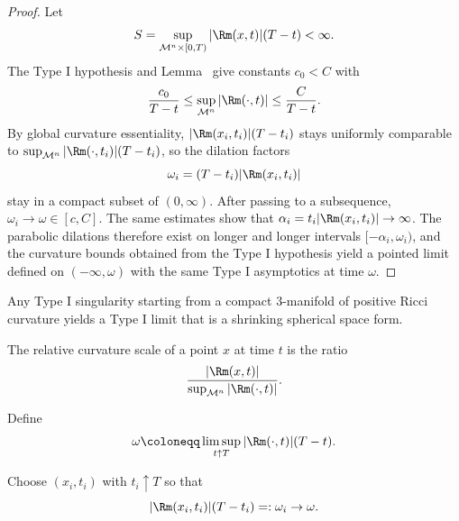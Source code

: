\begin{proof}
\sketch Let
\[
S=\sup_{\mathcal M^n\times[0,T)}|\Rm(x,t)|(T-t)<\infty.
\]
The Type I hypothesis and Lemma~ give constants \(c_0<C\) with
\[
\frac{c_0}{T-t}\le \sup_{\mathcal M^n}|\Rm(\cdot,t)|\le \frac{C}{T-t}.
\]
By global curvature essentiality, \(|\Rm(x_i,t_i)|(T-t_i)\) stays uniformly comparable to \(\sup_{\mathcal M^n}|\Rm(\cdot,t_i)|(T-t_i)\), so the dilation factors
\[
\omega_i=(T-t_i)|\Rm(x_i,t_i)|
\]
stay in a compact subset of \((0,\infty)\). After passing to a subsequence, \(\omega_i\to\omega\in[c,C]\). The same estimates show that \(\alpha_i=t_i|\Rm(x_i,t_i)|\to\infty\). The parabolic dilations therefore exist on longer and longer intervals \([-\alpha_i,\omega_i)\), and the curvature bounds obtained from the Type I hypothesis yield a pointed limit defined on \((-\infty,\omega)\) with the same Type I asymptotics at time \(\omega\).
\end{proof}

\begin{remark}
\label{ch08-rem-shrinking-spherical-space-forms}

Any Type I singularity starting from a compact \(3\)-manifold of positive Ricci curvature yields a Type I limit that is a shrinking spherical space form.
\end{remark}

\begin{remark}
\label{ch08-rem-relative-curvature-scale}

The relative curvature scale of a point \(x\) at time \(t\) is the ratio
\[
\frac{|\Rm(x,t)|}{\sup_{\mathcal M^n}|\Rm(\cdot,t)|}.
\]
\end{remark}

\begin{definition}
\label{ch08-def-type-i-limsup-scale}

Define
\[
\omega\coloneqq \limsup_{t\uparrow T}|\Rm(\cdot,t)|(T-t).
\]
\end{definition}

\begin{definition}
\label{ch08-def-type-i-rescaling-factors}

Choose \((x_i,t_i)\) with \(t_i\uparrow T\) so that
\[
|\Rm(x_i,t_i)|(T-t_i)=:\omega_i\to\omega.
\]
\end{definition}

